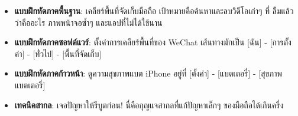 
\begin{itemize}
  \item \textbf{แบบฝึกหัดภาคพื้นฐาน}: เคลียร์พื้นที่จัดเก็บมือถือ เป้าหมายคือค้นหาและลบวิดีโอเก่าๆ ที่ ลืมแล้วว่าคืออะไร ภาพหน้าจอซ้ำๆ และแอปที่ไม่ได้ใช้นาน
  \item \textbf{แบบฝึกหัดภาคซอฟต์แวร์}: ตั้งค่าการเคลียร์พื้นที่ของ WeChat เส้นทางมักเป็น [ฉัน] - [การตั้งค่า] - [ทั่วไป] - [พื้นที่จัดเก็บ]
  \item \textbf{แบบฝึกหัดภาคก้าวหน้า}: ดูความสุขภาพแบต iPhone อยู่ที่ [ตั้งค่า] - [แบตเตอรี่] - [สุขภาพแบตเตอรี่]
  \item \textbf{เทคนิคสากล}: เจอปัญหาให้รีบูตก่อน! นี่คือกุญแจสากลที่แก้ปัญหาเล็กๆ ของมือถือได้เกินครึ่ง
\end{itemize}
